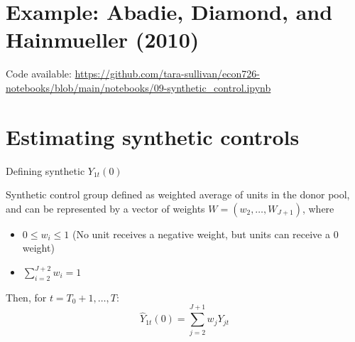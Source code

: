 \documentclass[compress, 8pt]{beamer}
\begin{document}
\section[Prop 99]{Example: Abadie, Diamond, and Hainmueller (2010)}
\miniframesoff
\begin{frame}
    \tableofcontents[currentsection]
\end{frame}
\miniframeson



\begin{frame}{}

Code available: \url{https://github.com/tara-sullivan/econ726-notebooks/blob/main/notebooks/09-synthetic_control.ipynb}

\end{frame}


\section[Estimation]{Estimating synthetic controls}
\miniframesoff
\begin{frame}
    \tableofcontents[currentsection]
\end{frame}
\miniframeson


\begin{frame}{Defining synthetic $Y_{1t} (0)$}



Synthetic control group defined as weighted average of units in the donor pool, and can be represented by a vector of weights $W = (w_2, \dots, W_{J + 1})$, where
\begin{itemize}
    \item $0 \leq w_i \leq 1$ (No unit receives a negative weight, but units can receive a 0 weight)
    \item $\sum_{i=2}^{J+2} w_i = 1$
\end{itemize}

\vspace{2ex}
Then, for $t=T_0+1, \dots, T$: 
\begin{equation*}
    \hat{Y}_{1t} (0) = \sum_{j=2}^{J+1} w_j Y_{jt}
\end{equation*}

\end{frame}
\end{document}
